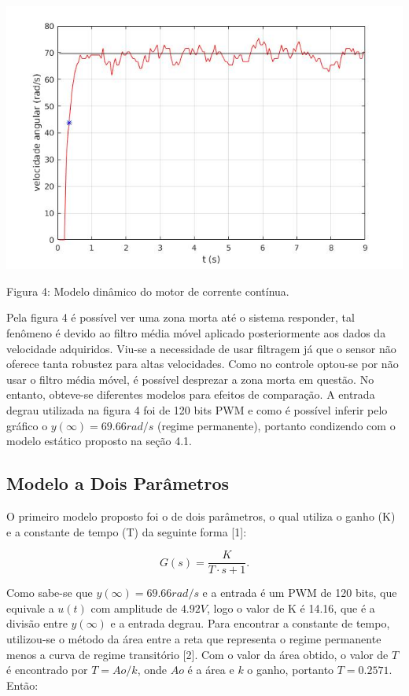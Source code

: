 \documentclass{article}
\begin{document}
\begin{center}
\centering
  \includegraphics[scale=0.5]{imagens/untitled2.jpg}
  
  \caption{Figura 4: Modelo dinâmico do motor de corrente contínua.}
\end{center}

Pela figura 4 é possível ver uma zona morta até o sistema responder, tal fenômeno é devido ao filtro média móvel aplicado posteriormente aos dados da velocidade adquiridos. Viu-se a necessidade de usar filtragem já que o sensor não oferece tanta robustez para altas velocidades. Como no controle optou-se por não usar o filtro média móvel, é possível desprezar a zona morta em questão. No entanto, obteve-se diferentes modelos para efeitos de comparação. A entrada degrau utilizada na figura 4 foi de 120 bits PWM e como é possível inferir pelo gráfico o $y({\infty}) = 69.66 rad/s$  (regime permanente), portanto condizendo com o modelo estático proposto na seção 4.1.

\subsection{Modelo a Dois Parâmetros}
O primeiro modelo proposto foi o de dois parâmetros, o qual utiliza o ganho (K) e a constante de tempo (T) da seguinte forma [1]:

\begin{equation}
    G(s) = \frac{K}{T \cdot s + 1}.
\end{equation}

Como sabe-se que $y({\infty}) = 69.66 rad/s$ e a entrada é um PWM de 120 bits, que equivale a $u(t)$ com amplitude de $4.92V$, logo o valor de K é 14.16, que é a divisão entre $y({\infty})$ e a entrada degrau. Para encontrar a constante de tempo, utilizou-se o método da área entre a reta que representa o regime permanente menos a curva de regime transitório [2]. Com o valor da área obtido, o valor de $T$ é encontrado por $T=Ao/k$, onde $Ao$ é a área e $k$ o ganho, portanto $T = 0.2571$. Então:
\end{document}

